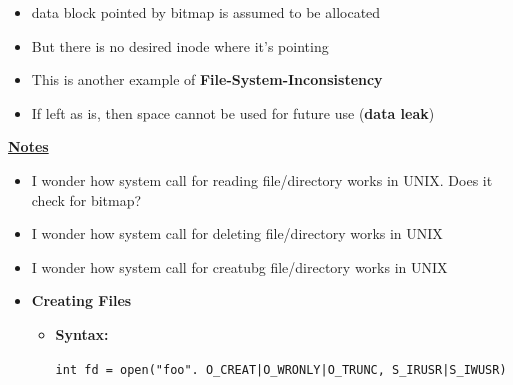 \documentclass[12pt]{article}
\begin{document}
\begin{enumerate}[1.]
\begin{enumerate}[a)]
\begin{itemize}
\begin{itemize}
                \begin{itemize}
                    \item data block pointed by bitmap is assumed to be allocated
                    \item But there is no desired inode where it's pointing
                    \item This is another example of \textbf{File-System-Inconsistency}
                    \item If left as is, then space cannot be used for future use (\textbf{data leak})
                \end{itemize}
            \end{itemize}
        \end{itemize}

        \bigskip

        \underline{\textbf{Notes}}

        \begin{itemize}
            \item I wonder how system call for reading file/directory works in UNIX. Does it check for bitmap?
            \item I wonder how system call for deleting file/directory works in UNIX
            \item I wonder how system call for creatubg file/directory works in UNIX

            \item \textbf{Creating Files}

            \begin{itemize}
                \item \textbf{Syntax:}

                \bigskip

                \texttt{int fd = open("foo". O\_CREAT|O\_WRONLY|O\_TRUNC, S\_IRUSR|S\_IWUSR)}

                \bigskip


\end{itemize}
\end{itemize}
\end{enumerate}
\end{enumerate}
\end{document}
